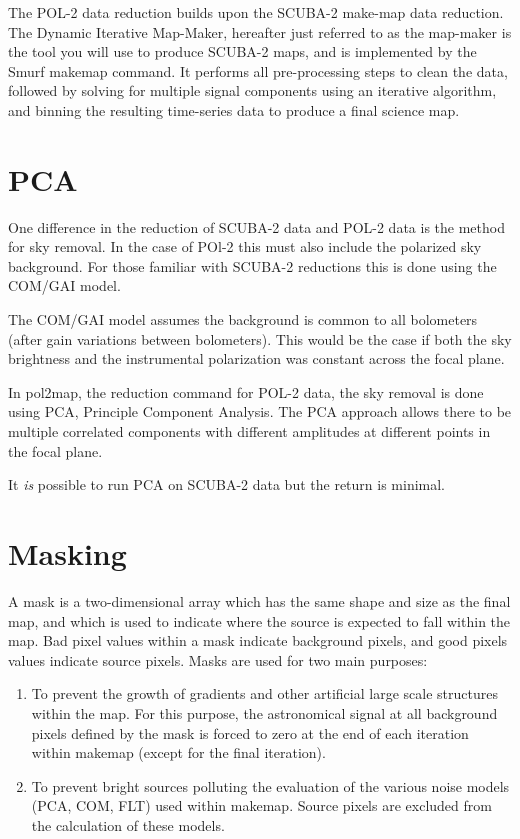 The POL-2 data reduction builds upon the SCUBA-2 make-map data reduction. The Dynamic Iterative Map-Maker, hereafter just referred to as the map-maker is the tool you will use to produce SCUBA-2 maps, and is implemented by the Smurf makemap command. It performs all pre-processing steps to clean the data, followed by solving for multiple signal components using an iterative algorithm, and binning the resulting time-series data to produce a final science map. 




\section{PCA}

One difference in the reduction of SCUBA-2 data and POL-2 data is the method for sky removal. 
In the case of POl-2 this must also include the polarized sky background. 
For those familiar with SCUBA-2 reductions this is done using the COM/GAI model. 

The COM/GAI model assumes the background is common to all bolometers (after gain variations between bolometers). This would be the case if both the sky brightness and the instrumental polarization was constant across the focal plane. 

In pol2map, the reduction command for POL-2 data, the sky removal is done using PCA, Principle Component Analysis.
The PCA approach allows there to be multiple correlated components with different amplitudes at different points in the focal plane.


It \emph{is} possible to run PCA on SCUBA-2 data but the return is minimal. 



\section{Masking}
A mask is a two-dimensional array which has the same shape and size as the final map, and
which is used to indicate where the source is expected to fall within the map. Bad pixel values
within a mask indicate background pixels, and good pixels values indicate source pixels. Masks
are used for two main purposes:

\begin{enumerate}\itemsep-0.2em
\item To prevent the growth of gradients and other artificial large scale structures within the
map.  For this purpose, the astronomical signal at all background pixels defined by the
mask is forced to zero at the end of each iteration within makemap (except for the final iteration).
\item To prevent bright sources polluting the evaluation of the various noise models (PCA, COM, FLT) used within
makemap. Source pixels are excluded from the calculation of these models.
\end{enumerate}


